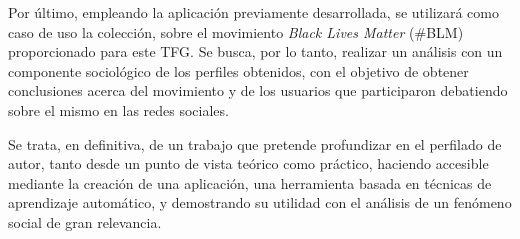 \bigskip
Por último, empleando la aplicación previamente desarrollada, se utilizará como caso de uso la colección, sobre el movimiento
\textit{Black Lives Matter} (\#BLM) proporcionado para este TFG. Se busca, por lo tanto, realizar un análisis con un componente sociológico
de los perfiles obtenidos,
con el objetivo de obtener conclusiones acerca del movimiento y de los usuarios que participaron debatiendo sobre el mismo en las redes sociales.

\bigskip
Se trata, en definitiva, de un trabajo que pretende profundizar en el perfilado de autor, tanto desde un punto de vista teórico como práctico,
haciendo accesible mediante la creación de una aplicación, una herramienta basada en técnicas de aprendizaje automático, y
demostrando su utilidad con el análisis de un fenómeno social de gran relevancia.
